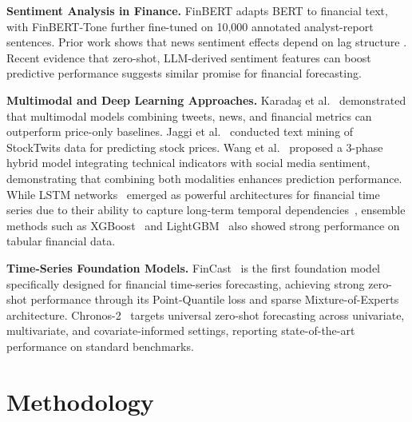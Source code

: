 \documentclass[a4paper,10pt,conference]{IEEEtran}
\begin{document}
\noindent\textbf{Sentiment Analysis in Finance.}
FinBERT \cite{araci2019} adapts BERT to financial text, with FinBERT-Tone \cite{huang2022} further fine-tuned on 10,000 annotated analyst-report sentences. Prior work shows that news sentiment effects depend on lag structure \cite{mo2016news}. Recent evidence that zero-shot, LLM-derived sentiment features can boost predictive performance \cite{samuel2025integrating} suggests similar promise for financial forecasting.

\noindent\textbf{Multimodal and Deep Learning Approaches.}
Karada\c{s} et al.~\cite{karadas2025} demonstrated that multimodal models combining tweets, news, and financial metrics can outperform price-only baselines. Jaggi et al.~\cite{jaggi2021} conducted text mining of StockTwits data for predicting stock prices. Wang et al.~\cite{wang2023learning} proposed a 3-phase hybrid model integrating technical indicators with social media sentiment, %
demonstrating that combining both modalities enhances prediction performance. While LSTM networks~\cite{hochreiter1997} emerged as powerful architectures for financial time series due to their ability to capture long-term temporal dependencies~\cite{fischer2018}, ensemble methods such as XGBoost~\cite{chen2016xgboost} and LightGBM~\cite{ke2017lightgbm} also showed strong performance on tabular financial data.

\noindent\textbf{Time-Series Foundation Models.}
FinCast~\cite{zhu2025fincast} is the first foundation model specifically designed for financial time-series forecasting, 
achieving strong zero-shot performance through its Point-Quantile loss and sparse Mixture-of-Experts architecture. Chronos-2~\cite{ansari2025chronos} targets universal zero-shot forecasting across univariate, multivariate, and covariate-informed settings, reporting state-of-the-art performance on standard benchmarks.%

\section{Methodology}
\end{document}
